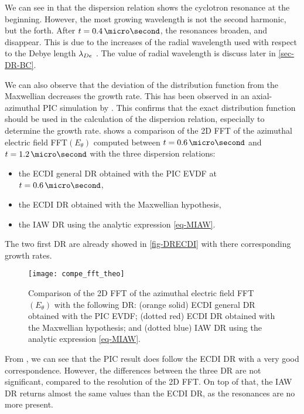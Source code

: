     We can see in  that the dispersion relation shows the cyclotron resonance at the beginning.
    However, the most growing wavelength is not the second harmonic, but the forth.
    After $t=0.4\,\micro\second$, the resonances broaden, and disappear.
    This is due to the increases of the radial wavelength used with respect to the Debye length $\lambda_{De}$ \citep{lafleur2016a,ducrocq2006,cavalier2013}.
    The value of radial wavelength is discuss later in \cref{sec-DR-BC}.
    
    We can also observe that the deviation of the distribution function from the Maxwellian decreases the growth rate.
    This has been observed  in an axial-azimuthal \ac{PIC} simulation by \citet{lafleur2018}.
    This confirms that the exact distribution function should be used in the calculation of the dispersion relation, especially to determine the growth rate.
     shows a comparison of the \ac{2D} \ac{FFT} of the azimuthal electric field FFT$(E_{\theta})$ computed between  $t=0.6\,\micro\second$ and $t=1.2\,\micro\second$  with the three dispersion relations\string:
    \begin{itemize}
      \item the \ac{ECDI} general \ac{DR} obtained with the \ac{PIC} \ac{EVDF} at $t=0.6\,\micro\second$,
      \item the \ac{ECDI} \ac{DR} obtained with the Maxwellian hypothesis,
      \item the \ac{IAW} \ac{DR} using the analytic expression \cref{eq-MIAW}. 
    \end{itemize}
    The two first \ac{DR} are already showed in \cref{fig-DRECDI} with there corresponding growth rates.

    \begin{figure}[!hbt]
      \centering
      \texttt{[image: compe\_fft\_theo]}
      \caption{Comparison of the \acs{2D} \acs{FFT} of the azimuthal electric field FFT$(E_{\theta})$ with the following \acs{DR}\string: (orange solid) \acs{ECDI} general \acs{DR} obtained with the \acs{PIC} \acs{EVDF}; (dotted red) \acs{ECDI} \acs{DR} obtained with the Maxwellian hypothesis; and (dotted blue) \acs{IAW} \acs{DR} using the analytic expression \cref{eq-MIAW}.   }
      \label{fig-DR_and_fft}
    \end{figure}
    
    From , we can see that the \ac{PIC} result does follow the \ac{ECDI} \ac{DR} with a very good correspondence.
    However, the differences between the three \ac{DR} are not significant, compared to the resolution of the \ac{2D} \ac{FFT}.
    On top of that, the \ac{IAW} \ac{DR} returns almost the same values than the \ac{ECDI} \ac{DR}, as the resonances are no more present.
    

